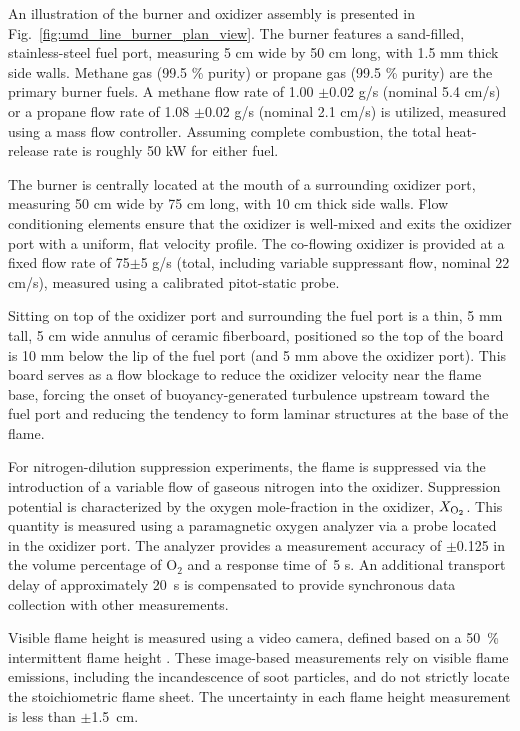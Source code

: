 An illustration of the burner and oxidizer assembly is presented in Fig.~\ref{fig:umd_line_burner_plan_view}.  The burner features a sand-filled, stainless-steel fuel port, measuring 5 cm wide by 50 cm long, with 1.5 mm thick side walls. Methane gas (99.5 \% purity) or propane gas (99.5 \% purity) are the primary burner fuels. A methane flow rate of 1.00 $\pm$0.02 g/s (nominal 5.4 cm/s) or a propane flow rate of 1.08 $\pm$0.02 g/s (nominal 2.1 cm/s) is utilized, measured using a mass flow controller. Assuming complete combustion, the total heat-release rate is roughly 50 kW for either fuel.

The burner is centrally located at the mouth of a surrounding oxidizer port, measuring 50 cm wide by 75 cm long, with 10 cm thick side walls. Flow conditioning elements ensure that the oxidizer is well-mixed and exits the oxidizer port with a uniform, flat velocity profile. The co-flowing oxidizer is provided at a fixed flow rate of 75$\pm$5 g/s (total, including variable suppressant flow, nominal 22 cm/s), measured using a calibrated pitot-static probe.

Sitting on top of the oxidizer port and surrounding the fuel port is a thin, 5 mm tall, 5 cm wide annulus of ceramic fiberboard, positioned so the top of the board is 10 mm below the lip of the fuel port (and 5 mm above the oxidizer port). This board serves as a flow blockage to reduce the oxidizer velocity near the flame base, forcing the onset of buoyancy-generated turbulence upstream toward the fuel port and reducing the tendency to form laminar structures at the base of the flame.

For nitrogen-dilution suppression experiments, the flame is suppressed via the introduction of a variable flow of gaseous nitrogen into the oxidizer. Suppression potential is characterized by the oxygen mole-fraction in the oxidizer, $X_{\rm O_2}$. This quantity is measured using a paramagnetic oxygen analyzer via a probe located in the oxidizer port. The analyzer provides a measurement accuracy of $\pm$0.125 in the volume percentage of O$_2$ and a response time of~5 s. An additional transport delay of approximately 20~s is compensated to provide synchronous data collection with other measurements.

Visible flame height is measured using a video camera, defined based on a 50~\% intermittent flame height \cite{White:2015}. These image-based measurements rely on visible flame emissions, including the incandescence of soot particles, and do not strictly locate the stoichiometric flame sheet. The uncertainty in each flame height measurement is less than $\pm$1.5~cm.

